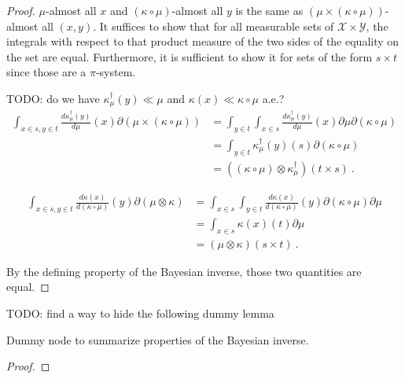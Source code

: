 \begin{proof}%
\uses{}
$\mu$-almost all $x$ and $(\kappa \circ \mu)$-almost all $y$ is the same as $(\mu \times (\kappa \circ \mu))$-almost all $(x, y)$.
It suffices to show that for all measurable sets of $\mathcal X \times \mathcal Y$, the integrals with respect to that product measure of the two sides of the equality on the set are equal. Furthermore, it is sufficient to show it for sets of the form $s \times t$ since those are a $\pi$-system.

TODO: do we have $\kappa_\mu^\dagger(y) \ll \mu$ and $\kappa(x) \ll \kappa \circ \mu$ a.e.?
\begin{align*}
\int_{x \in s, y \in t} \frac{d \kappa_\mu^\dagger(y)}{d \mu}(x) \partial (\mu \times (\kappa \circ \mu))
&= \int_{y \in t} \int_{x \in s} \frac{d \kappa_\mu^\dagger(y)}{d \mu}(x) \partial \mu \partial (\kappa \circ \mu)
\\
&= \int_{y \in t} \kappa_\mu^\dagger(y)(s) \partial (\kappa \circ \mu)
\\
&= ((\kappa \circ \mu) \otimes \kappa_\mu^\dagger) (t \times s)
\: .
\end{align*}

\begin{align*}
\int_{x \in s, y \in t} \frac{d \kappa(x)}{d(\kappa \circ \mu)}(y) \partial (\mu \otimes \kappa)
&= \int_{x \in s} \int_{y \in t} \frac{d \kappa(x)}{d(\kappa \circ \mu)}(y) \partial (\kappa \circ \mu) \partial \mu
\\
&= \int_{x \in s} \kappa(x)(t) \partial \mu
\\
&= (\mu \otimes \kappa) (s \times t)
\: .
\end{align*}

By the defining property of the Bayesian inverse, those two quantities are equal.
\end{proof}



TODO: find a way to hide the following dummy lemma
\begin{lemma}
  \label{lem:bayesInv_properties}
  \leanok
  Dummy node to summarize properties of the Bayesian inverse.
\end{lemma}

\begin{proof}\leanok
{}
\end{proof}